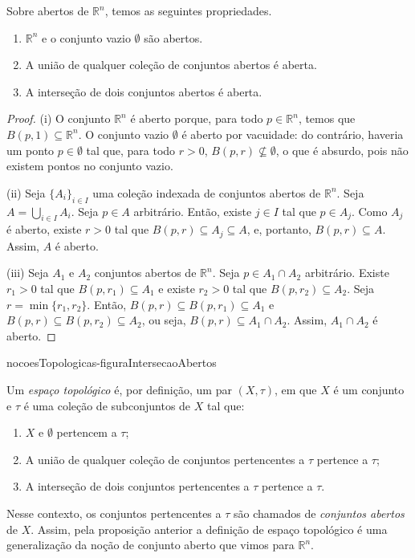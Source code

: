 \begin{proposition}
    Sobre abertos de $\mathbb R^n$, temos as seguintes propriedades.
    \begin{enumerate}[label=(\roman*)]
        \item $\mathbb R^n$ e o conjunto vazio $\emptyset$ são abertos.
        \item A união de qualquer coleção de conjuntos abertos é aberta.
        \item A interseção de dois conjuntos abertos é aberta.
    \end{enumerate}
\end{proposition}
\begin{proof}
    (i) O conjunto $\mathbb R^n$ é aberto porque, para todo $p \in \mathbb R^n$, temos que $B(p, 1) \subseteq \mathbb R^n$.
    O conjunto vazio $\emptyset$ é aberto por vacuidade: do contrário, haveria um ponto $p \in \emptyset$ tal que, para todo $r>0$, $B(p, r)\not\subseteq \emptyset$, o que é absurdo, pois não existem pontos no conjunto vazio.

    (ii) Seja $\{A_i\}_{i \in I}$ uma coleção indexada de conjuntos abertos de $\mathbb R^n$.
    Seja $A = \bigcup_{i \in I} A_i$.
    Seja $p \in A$ arbitrário.
    Então, existe $j \in I$ tal que $p \in A_j$.
    Como $A_j$ é aberto, existe $r>0$ tal que $B(p, r) \subseteq A_j\subseteq A$, e, portanto, $B(p, r) \subseteq A$.
    Assim, $A$ é aberto.

    (iii) Seja $A_1$ e $A_2$ conjuntos abertos de $\mathbb R^n$.
    Seja $p \in A_1\cap A_2$ arbitrário.
    Existe $r_1>0$ tal que $B(p, r_1) \subseteq A_1$ e existe $r_2>0$ tal que $B(p, r_2) \subseteq A_2$.
    Seja $r = \min\{r_1, r_2\}$.
    Então, $B(p, r) \subseteq B(p, r_1) \subseteq A_1$ e $B(p, r) \subseteq B(p, r_2) \subseteq A_2$, ou seja, $B(p, r) \subseteq A_1\cap A_2$.
    Assim, $A_1\cap A_2$ é aberto.
\end{proof}
{nocoesTopologicas-figuraIntersecaoAbertos}

\begin{knowMore}
    Um \emph{espaço topológico} é, por definição, um par $(X, \tau)$, em que $X$ é um conjunto e $\tau$ é uma coleção de subconjuntos de $X$ tal que:
    \begin{enumerate}[label=(\roman*)]
        \item $X$ e $\emptyset$ pertencem a $\tau$;
        \item A união de qualquer coleção de conjuntos pertencentes a $\tau$ pertence a $\tau$;
        \item A interseção de dois conjuntos pertencentes a $\tau$ pertence a $\tau$.
    \end{enumerate}
    Nesse contexto, os conjuntos pertencentes a $\tau$ são chamados de \emph{conjuntos abertos} de $X$.
    Assim, pela proposição anterior a definição de espaço topológico é uma generalização da noção de conjunto aberto que vimos para $\mathbb R^n$.
\end{knowMore}

